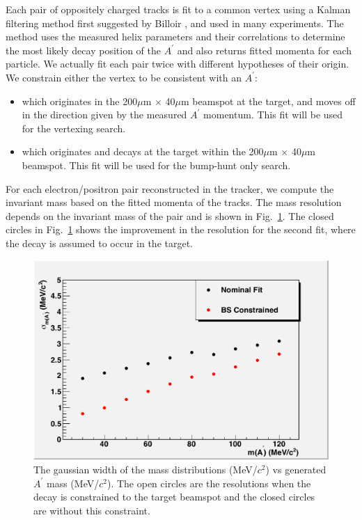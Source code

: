 Each pair of oppositely charged tracks is fit to a common vertex using a Kalman filtering 
method first suggested by Billoir \cite{bf}, \cite{bq} and used in many experiments.  The method 
uses the measured helix parameters and their correlations to determine the most likely 
decay position of the $A^\prime$ and also returns fitted momenta for each particle.  We actually 
fit each pair twice with different hypotheses of their origin.  We constrain either 
the vertex to be consistent with an $A^\prime$:

\begin{itemize}
\item which originates in the 200$\mu$m $\times$ 40$\mu$m beamspot at the target, and moves off 
in the direction given by the measured $A^\prime$ momentum.  This fit will be used for the vertexing search.  
\item which originates and decays at the target within the 200$\mu$m $\times$ 40$\mu$m beamspot.  
This fit will be used for the bump-hunt only search.  
\end{itemize}

For each electron/positron pair reconstructed in the tracker, we compute the invariant mass based 
on the fitted momenta of the tracks.  The mass resolution depends on the invariant mass of the pair 
and is shown in Fig.~\ref{fig:massres}.  The closed circles  in Fig.~\ref{fig:massres} shows the improvement 
in the resolution for the second fit, where the decay is assumed to occur in the target.  

\begin{figure}
\includegraphics[scale=0.8]{performance/tracking_performance/massRes-2pt2.pdf}
\caption{The gaussian width of the mass distributions (MeV/$c^2$) vs generated $A^\prime$ mass (MeV/$c^2$). 
 The open circles are the resolutions when the decay is constrained to the target beamspot 
and the closed circles are without this constraint.    }
\label{fig:massres}
\end{figure}



